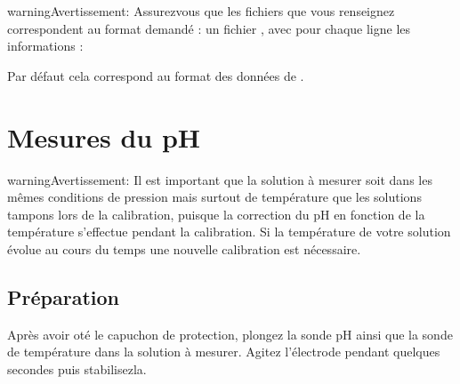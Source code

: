 \documentclass[letterpaper,10pt,french]{sphinxmanual}
\begin{document}
\begin{sphinxadmonition}{warning}{Avertissement:}
\sphinxAtStartPar
Assurez\sphinxhyphen{}vous que les fichiers que vous renseignez correspondent au format demandé :
un fichier , avec pour chaque ligne les informations :

\begin{sphinxVerbatim}[commandchars=\\\{\}]
  
  
  
  
  
  
  
  
  
\end{sphinxVerbatim}

\sphinxAtStartPar
Par défaut cela correspond au format des données de {\hyperref[\detokenize{mesure:mesure}]{}}.
\end{sphinxadmonition}

\sphinxstepscope


\chapter{Mesures du pH}
\label{\detokenize{mesure:mesures-du-ph}}\label{\detokenize{mesure:mesure}}\label{\detokenize{mesure::doc}}
\begin{sphinxadmonition}{warning}{Avertissement:}
\sphinxAtStartPar
Il est important que la solution à mesurer soit dans les mêmes conditions de pression mais surtout de
température que les solutions tampons lors de la calibration, puisque la correction du pH en fonction de
la température s’effectue pendant la calibration. Si la température de votre solution évolue au cours du
temps une nouvelle calibration est nécessaire.
\end{sphinxadmonition}


\section{Préparation}
\label{\detokenize{mesure:preparation}}
\sphinxAtStartPar
Après avoir oté le capuchon de protection, plongez la sonde pH ainsi que la sonde de température dans la solution à mesurer.
Agitez l’électrode pendant quelques secondes puis stabilisez\sphinxhyphen{}la.
\end{document}
